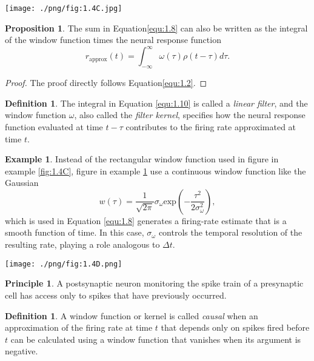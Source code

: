 \documentclass[letterpaper,oneside]{book}
\numberwithin{equation}{chapter}
\theoremstyle{definition}
\newtheorem{defn}[thm]{Definition}
\newtheorem{exm}[thm]{Example}
\newtheorem{prop}[thm]{Proposition}
\newtheorem{prin}[thm]{Principle}
\begin{document}
\begin{multicols}{2}
\begin{center}
  \texttt{[image: ./png/fig:1.4C.jpg]}
\end{center}

\begin{prop}
  The sum in Equation\ref{equ:1.8} can also be written as the integral of the window
function times the neural response function
\begin{equation}
  \label{equ:1.10}
  r_{\text{approx}}(t)=\int_{-\infty}^{\infty}\omega(\tau)\rho(t-\tau)d\tau.
\end{equation}
\begin{proof}
  The proof directly follows Equation\ref{equ:1.2}.
\end{proof}
\end{prop}

\begin{defn}
  The integral in Equation \ref{equ:1.10} is called a \emph{linear filter}, and the window 
  function $\omega$, also called the \emph{filter kernel}, specifies how the neural 
  response function evaluated at time $t-\tau$ contributes to the firing rate approximated 
  at time $t$.
\end{defn}

\begin{exm}
  \label{fig:1.4D}
  Instead of the rectangular window function used in figure in example \ref{fig:1.4C}, 
  figure in example \ref{fig:1.4D} use a 
  continuous window function like the Gaussian
  \begin{equation}
    \label{equ:1.11}
    w(\tau)=\frac{1}{\sqrt{2\pi}}\sigma_{\omega}\text{exp}\left(-\frac{\tau^2}{2\sigma_{\omega}^2} \right),  
  \end{equation}
   which is used in Equation \ref{equ:1.8} generates 
a firing-rate estimate that is a smooth function of time.
In this case, $\sigma_{\omega}$  controls the temporal resolution of the resulting rate, 
playing a role analogous to $\Delta t$.
\end{exm}

\begin{center}
  \texttt{[image: ./png/fig:1.4D.png]}
\end{center}

\begin{prin}
  A postsynaptic neuron monitoring the spike train of a presynaptic cell has
access only to spikes that have previously occurred.
\end{prin}

\begin{defn}
  A window function or kernel is called \emph{causal} when an approximation
of the firing rate at time $t$ that depends only on spikes fired before $t$ can
be calculated using a window function that vanishes when its argument is negative.


\end{defn}
\end{multicols}
\end{document}
